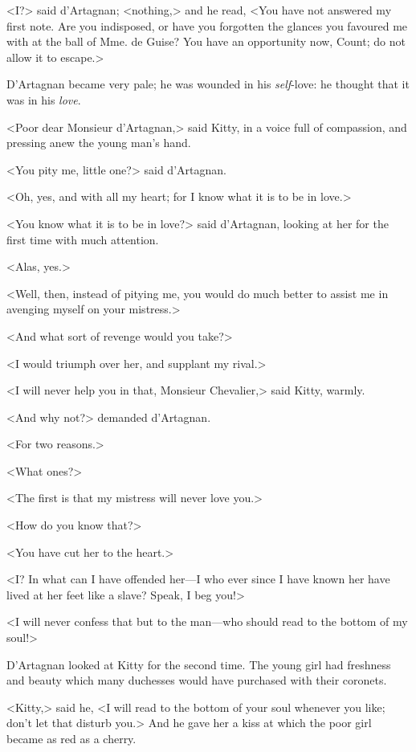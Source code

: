 <I?> said d'Artagnan; <nothing,> and he read, <You have not answered my first note. Are you indisposed, or have you forgotten the glances you favoured me with at the ball of Mme. de Guise? You have an opportunity now, Count; do not allow it to escape.> 

D'Artagnan became very pale; he was wounded in his \textit{self}-love: he thought that it was in his \textit{love}. 

<Poor dear Monsieur d'Artagnan,> said Kitty, in a voice full of compassion, and pressing anew the young man's hand. 

<You pity me, little one?> said d'Artagnan. 

<Oh, yes, and with all my heart; for I know what it is to be in love.> 

<You know what it is to be in love?> said d'Artagnan, looking at her for the first time with much attention. 

<Alas, yes.> 

<Well, then, instead of pitying me, you would do much better to assist me in avenging myself on your mistress.> 

<And what sort of revenge would you take?> 

<I would triumph over her, and supplant my rival.> 

<I will never help you in that, Monsieur Chevalier,> said Kitty, warmly. 

<And why not?> demanded d'Artagnan. 

<For two reasons.> 

<What ones?> 

<The first is that my mistress will never love you.> 

<How do you know that?> 

<You have cut her to the heart.> 

<I? In what can I have offended her---I who ever since I have known her have lived at her feet like a slave? Speak, I beg you!> 

<I will never confess that but to the man---who should read to the bottom of my soul!> 

D'Artagnan looked at Kitty for the second time. The young girl had freshness and beauty which many duchesses would have purchased with their coronets. 

<Kitty,> said he, <I will read to the bottom of your soul whenever you like; don't let that disturb you.> And he gave her a kiss at which the poor girl became as red as a cherry. 

